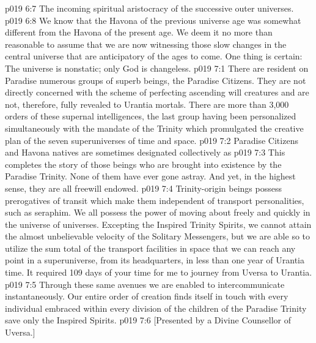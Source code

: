 \vs p019 6:7 \bibnobreakspace The incoming spiritual aristocracy of the successive outer universes.
\vs p019 6:8 We know that the Havona of the previous universe age was somewhat different from the Havona of the present age. We deem it no more than reasonable to assume that we are now witnessing those slow changes in the central universe that are anticipatory of the ages to come. One thing is certain: The universe is nonstatic; only God is changeless.
\vs p019 7:1 There are resident on Paradise numerous groups of superb beings, the Paradise Citizens. They are not directly concerned with the scheme of perfecting ascending will creatures and are not, therefore, fully revealed to Urantia mortals. There are more than 3,000 orders of these supernal intelligences, the last group having been personalized simultaneously with the mandate of the Trinity which promulgated the creative plan of the seven superuniverses of time and space.
\vs p019 7:2 \pc Paradise Citizens and Havona natives are sometimes designated collectively as 
\vs p019 7:3 \pc This completes the story of those beings who are brought into existence by the Paradise Trinity. None of them have ever gone astray. And yet, in the highest sense, they are all freewill endowed.
\vs p019 7:4 Trinity\hyp{}origin beings possess prerogatives of transit which make them independent of transport personalities, such as seraphim. We all possess the power of moving about freely and quickly in the universe of universes. Excepting the Inspired Trinity Spirits, we cannot attain the almost unbelievable velocity of the Solitary Messengers, but we are able so to utilize the sum total of the transport facilities in space that we can reach any point in a superuniverse, from its headquarters, in less than one year of Urantia time. It required 109 days of your time for me to journey from Uversa to Urantia.
\vs p019 7:5 Through these same avenues we are enabled to intercommunicate instantaneously. Our entire order of creation finds itself in touch with every individual embraced within every division of the children of the Paradise Trinity save only the Inspired Spirits.
\vsetoff
\vs p019 7:6 [Presented by a Divine Counsellor of Uversa.]
\quizlink
